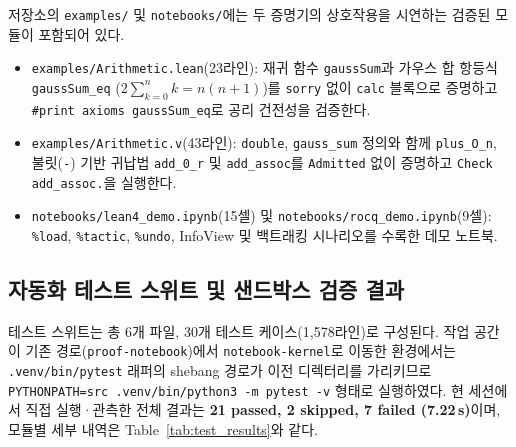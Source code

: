 \documentclass[journal]{IEEEtran}
\newcommand{\code}[1]{\texttt{#1}}
\begin{document}
저장소의 \code{examples/} 및 \code{notebooks/}에는 두 증명기의 상호작용을 시연하는 검증된 모듈이 포함되어 있다.
\begin{itemize}
  \item \code{examples/Arithmetic.lean}(23라인): 재귀 함수 \code{gaussSum}과 가우스 합 항등식 \code{gaussSum\_eq} ($2 \sum_{k=0}^{n} k = n(n+1)$)를 \code{sorry} 없이 \code{calc} 블록으로 증명하고 \code{\#print axioms gaussSum\_eq}로 공리 건전성을 검증한다.
  \item \code{examples/Arithmetic.v}(43라인): \code{double}, \code{gauss\_sum} 정의와 함께 \code{plus\_O\_n}, 불릿(\code{-}) 기반 귀납법 \code{add\_0\_r} 및 \code{add\_assoc}를 \code{Admitted} 없이 증명하고 \code{Check add\_assoc.}을 실행한다.
  \item \code{notebooks/lean4\_demo.ipynb}(15셀) 및 \code{notebooks/rocq\_demo.ipynb}(9셀): \code{\%load}, \code{\%tactic}, \code{\%undo}, InfoView 및 백트래킹 시나리오를 수록한 데모 노트북.
\end{itemize}

\subsection{자동화 테스트 스위트 및 샌드박스 검증 결과}
테스트 스위트는 총 6개 파일, 30개 테스트 케이스(1,578라인)로 구성된다. 작업 공간이 기존 경로(\code{proof-notebook})에서 \code{notebook-kernel}로 이동한 환경에서는 \code{.venv/bin/pytest} 래퍼의 shebang 경로가 이전 디렉터리를 가리키므로 \code{PYTHONPATH=src .venv/bin/python3 -m pytest -v} 형태로 실행하였다. 현 세션에서 직접 실행·관측한 전체 결과는 \textbf{21 passed, 2 skipped, 7 failed (7.22\,s)}이며, 모듈별 세부 내역은 Table~\ref{tab:test_results}와 같다.
\end{document}
